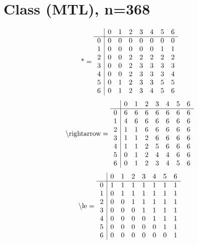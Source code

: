 \documentclass[11pt]{article}
\begin{document}
\section{Class (MTL), n=368}
\[\text{*} = 
\begin{array}{r | r r r r r r r}
 & 0 & 1 & 2 & 3 & 4 & 5 & 6 \\ \hline
0 & 0 & 0 & 0 & 0 & 0 & 0 & 0 \\
1 & 0 & 0 & 0 & 0 & 0 & 1 & 1 \\
2 & 0 & 0 & 2 & 2 & 2 & 2 & 2 \\
3 & 0 & 0 & 2 & 3 & 3 & 3 & 3 \\
4 & 0 & 0 & 2 & 3 & 3 & 3 & 4 \\
5 & 0 & 1 & 2 & 3 & 3 & 5 & 5 \\
6 & 0 & 1 & 2 & 3 & 4 & 5 & 6 \\
\end{array}
\]
\[\text{\textbackslash rightarrow} = 
\begin{array}{r | r r r r r r r}
 & 0 & 1 & 2 & 3 & 4 & 5 & 6 \\ \hline
0 & 6 & 6 & 6 & 6 & 6 & 6 & 6 \\
1 & 4 & 6 & 6 & 6 & 6 & 6 & 6 \\
2 & 1 & 1 & 6 & 6 & 6 & 6 & 6 \\
3 & 1 & 1 & 2 & 6 & 6 & 6 & 6 \\
4 & 1 & 1 & 2 & 5 & 6 & 6 & 6 \\
5 & 0 & 1 & 2 & 4 & 4 & 6 & 6 \\
6 & 0 & 1 & 2 & 3 & 4 & 5 & 6 \\
\end{array}
\]
\[\text{\textbackslash le} = 
\begin{array}{r | r r r r r r r}
 & 0 & 1 & 2 & 3 & 4 & 5 & 6 \\ \hline
0 & 1 & 1 & 1 & 1 & 1 & 1 & 1 \\
1 & 0 & 1 & 1 & 1 & 1 & 1 & 1 \\
2 & 0 & 0 & 1 & 1 & 1 & 1 & 1 \\
3 & 0 & 0 & 0 & 1 & 1 & 1 & 1 \\
4 & 0 & 0 & 0 & 0 & 1 & 1 & 1 \\
5 & 0 & 0 & 0 & 0 & 0 & 1 & 1 \\
6 & 0 & 0 & 0 & 0 & 0 & 0 & 1 \\
\end{array}
\]
\end{document}
